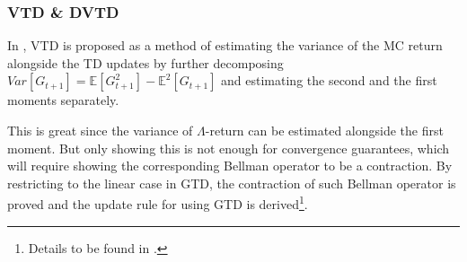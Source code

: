 \documentclass{article}
\newcommand\doubleE{\mathbb{E}}
\begin{document}
\subsubsection{VTD \& DVTD}
In \cite{white2016greedy}, VTD is proposed as a method of estimating the variance of the MC return alongside the TD updates by further decomposing $Var[G_{t+1}] = \doubleE[G_{t+1}^2] - \doubleE^2[G_{t+1}]$ and estimating the second and the first moments separately.
\par
This is great since the variance of $\Lambda$-return can be estimated alongside the first moment. But only showing this is not enough for convergence guarantees, which will require showing the corresponding Bellman operator to be a contraction. By restricting to the linear case in GTD, the contraction of such Bellman operator is proved and the update rule for using GTD is derived\footnote{Details to be found in \cite{white2016greedy}.}.
\end{document}
